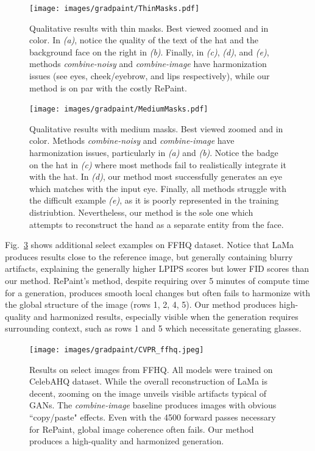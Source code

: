        

    \begin{figure}[H]
      \centering
      \texttt{[image: images/gradpaint/ThinMasks.pdf]} %
        \caption{Qualitative results with thin masks. Best viewed zoomed and in color. 
        In \emph{(a)}, notice the quality of the text of the hat and the background face on the right in \emph{(b)}. 
        Finally, in \emph{(c)}, \emph{(d)}, and \emph{(e)}, methods \emph{combine-noisy} and \emph{combine-image} 
        have harmonization issues (see eyes, cheek/eyebrow, and lips respectively), while our method is on par with the costly RePaint.}
    \label{fig:qualitative_thin}
    \end{figure}
    
    \begin{figure}[H]
      \centering
      \texttt{[image: images/gradpaint/MediumMasks.pdf]}
        \caption{Qualitative results with medium masks. Best viewed zoomed and in color. Methods \emph{combine-noisy} and \emph{combine-image} have harmonization issues, particularly in \emph{(a)} and \emph{(b)}. Notice the badge on the hat in \emph{(c)} where most methods fail to realistically integrate it with the hat. In \emph{(d)}, our method most successfully generates an eye which matches with the input eye. Finally, all methods struggle with the difficult example \emph{(e)}, as it is poorly represented in the training distriubtion.  Nevertheless, our method is the sole one which attempts to reconstruct the hand as a separate entity from the face.}
    \label{fig:qualitative_thick}
    \end{figure}



    Fig.~\ref{fig:res_ffhq} shows additional select examples on FFHQ dataset. Notice that LaMa produces results
    close to the reference image, but generally containing blurry artifacts, explaining the generally higher
     LPIPS scores but lower FID scores than our method. RePaint's method, despite requiring over 5 minutes of 
     compute time for a generation, produces smooth local changes but often fails to harmonize with the global
      structure of the image (rows 1, 2, 4, 5). Our method produces high-quality and harmonized results, especially
       visible when the generation requires surrounding context, such as rows 1 and 5 which necessitate generating glasses.
 

\begin{figure}[H]
  \centering
  \texttt{[image: images/gradpaint/CVPR\_ffhq.jpeg]}
  \caption{Results on select images from FFHQ. All models were trained on CelebAHQ dataset.
  While the overall reconstruction of LaMa is decent, zooming on the image unveils 
  visible artifacts typical of \ac{GAN}s. The \emph{combine-image}
   baseline produces images with obvious ``copy/paste" effects. Even 
   with the 4500 forward passes necessary for RePaint, global image coherence often fails.  
   Our method produces a high-quality and harmonized generation.}
\label{fig:res_ffhq}
\end{figure}




